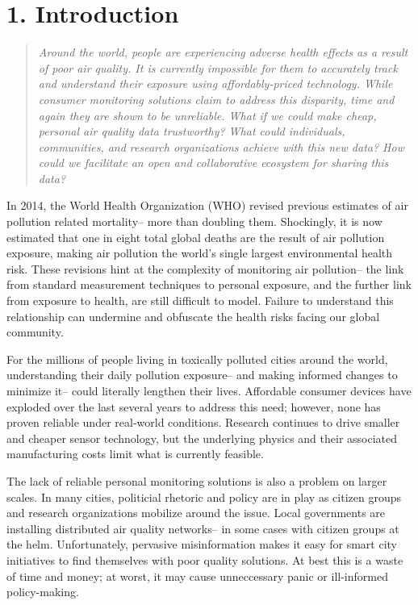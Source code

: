 \chapter{1. Introduction}

\begin{quote}
\textit{Around the world, people are experiencing adverse health effects as a result of poor air quality.  It is currently impossible for them to accurately track and understand their exposure using affordably-priced technology.  While consumer monitoring solutions claim to address this disparity, time and again they are shown to be unreliable. \newline 	What if we could make cheap, personal air quality data trustworthy?  What could individuals, communities, and research organizations achieve with this new data?  How could we facilitate an open and collaborative ecosystem for sharing this data?} 
\newline
\end{quote}

In 2014, the World Health Organization (WHO) revised previous estimates of air pollution related mortality-- more than doubling them. Shockingly, it is now estimated that one in eight total global deaths are the result of air pollution exposure, making air pollution the world's single largest environmental health risk.  These revisions hint at the complexity of monitoring air pollution-- the link from standard measurement techniques to personal exposure, and the further link from exposure to health, are still difficult to model.  Failure to understand this relationship can undermine and obfuscate the health risks facing our global community.

For the millions of people living in toxically polluted cities around the world, understanding their daily pollution exposure-- and making informed changes to minimize it-- could literally lengthen their lives.  Affordable consumer devices have exploded over the last several years to address this need; however, none has proven reliable under real-world conditions.  Research continues to drive smaller and cheaper sensor technology, but the underlying physics and their associated manufacturing costs limit what is currently feasible.

The lack of reliable personal monitoring solutions is also a problem on larger scales.  In many cities, politicial rhetoric and policy are in play as citizen groups and research organizations mobilize around the issue.  Local governments are installing distributed air quality networks-- in some cases with citizen groups at the helm.  Unfortunately, pervasive misinformation makes it easy for smart city initiatives to find themselves with poor quality solutions.  At best this is a waste of time and money; at worst, it may cause unneccessary panic or ill-informed policy-making.  

